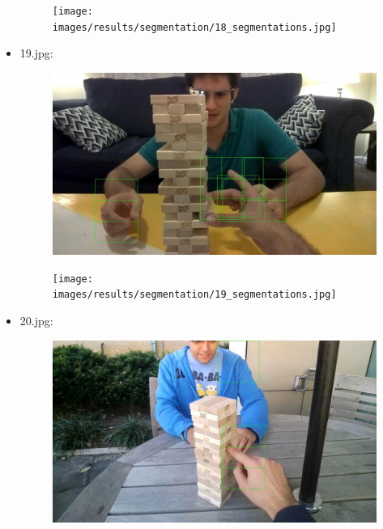 \begin{itemize}
\begin{figure}[!htb]
\begin{minipage}{0.5\textwidth}
            \end{minipage}\hfill
            \begin{minipage}{0.5\textwidth}
                \centering
                \texttt{[image: images/results/segmentation/18\_segmentations.jpg]}
            \end{minipage}
        \end{figure}
    \item 19.jpg:
        \begin{figure}[!htb]
            \begin{minipage}{0.5\textwidth}
                \centering
                \includegraphics[scale = 0.205]{images/results/detection/19_detections.jpg}
            \end{minipage}\hfill
            \begin{minipage}{0.5\textwidth}
                \centering
                \texttt{[image: images/results/segmentation/19\_segmentations.jpg]}
            \end{minipage}
        \end{figure}
    \item 20.jpg:
        \begin{figure}[!htb]
            \begin{minipage}{0.5\textwidth}
                \centering
                \includegraphics[scale = 0.205]{images/results/detection/20_detections.jpg}

\end{minipage}
\end{figure}
\end{itemize}

